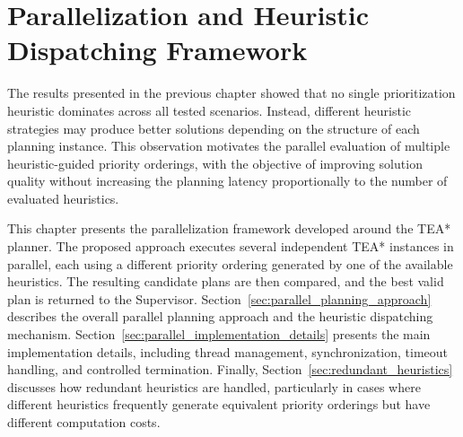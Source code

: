 \chapter{Parallelization and Heuristic Dispatching Framework} 
\label{chap:ch6}
\hspace{\parindent}
The results presented in the previous chapter showed that no single prioritization heuristic
dominates across all tested scenarios. Instead, different heuristic strategies may produce better
solutions depending on the structure of each planning instance. This observation motivates the
parallel evaluation of multiple heuristic-guided priority orderings, with the objective of improving
solution quality without increasing the planning latency proportionally to the number of evaluated
heuristics.

This chapter presents the parallelization framework developed around the TEA* planner. The
proposed approach executes several independent TEA* instances in parallel, each using a different
priority ordering generated by one of the available heuristics. The resulting candidate plans are
then compared, and the best valid plan is returned to the Supervisor. Section~\ref{sec:parallel_planning_approach}
describes the overall parallel planning approach and the heuristic dispatching mechanism.
Section~\ref{sec:parallel_implementation_details} presents the main implementation details,
including thread management, synchronization, timeout handling, and controlled termination.
Finally, Section~\ref{sec:redundant_heuristics} discusses how redundant heuristics are handled,
particularly in cases where different heuristics frequently generate equivalent priority orderings
but have different computation costs.

